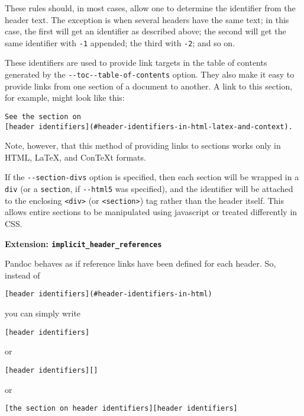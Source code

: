 \documentclass[]{article}
\begin{document}
These rules should, in most cases, allow one to determine the identifier
from the header text. The exception is when several headers have the
same text; in this case, the first will get an identifier as described
above; the second will get the same identifier with \texttt{-1}
appended; the third with \texttt{-2}; and so on.

These identifiers are used to provide link targets in the table of
contents generated by the
\texttt{-{}-toc\textbar{}-{}-table-of-contents} option. They also make
it easy to provide links from one section of a document to another. A
link to this section, for example, might look like this:

\begin{verbatim}
See the section on
[header identifiers](#header-identifiers-in-html-latex-and-context).
\end{verbatim}

Note, however, that this method of providing links to sections works
only in HTML, LaTeX, and ConTeXt formats.

If the \texttt{-{}-section-divs} option is specified, then each section
will be wrapped in a \texttt{div} (or a \texttt{section}, if
\texttt{-{}-html5} was specified), and the identifier will be attached
to the enclosing \texttt{\textless{}div\textgreater{}} (or
\texttt{\textless{}section\textgreater{}}) tag rather than the header
itself. This allows entire sections to be manipulated using javascript
or treated differently in CSS.

\textbf{Extension: \texttt{implicit\_header\_references}}

Pandoc behaves as if reference links have been defined for each header.
So, instead of

\begin{verbatim}
[header identifiers](#header-identifiers-in-html)
\end{verbatim}

you can simply write

\begin{verbatim}
[header identifiers]
\end{verbatim}

or

\begin{verbatim}
[header identifiers][]
\end{verbatim}

or

\begin{verbatim}
[the section on header identifiers][header identifiers]
\end{verbatim}
\end{document}
